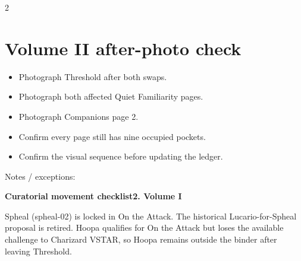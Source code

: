 \documentclass[10pt,a4paper]{article}
\newcommand{\smallnote}[1]{{\fontsize{8.4}{10}\selectfont #1\par}}
\begin{document}
\begin{multicols}{2}
\section{Volume II after-photo check}
\begin{itemize}
\item Photograph Threshold after both swaps.
\item Photograph both affected Quiet Familiarity pages.
\item Photograph Companions page 2.
\item Confirm every page still has nine occupied pockets.
\item Confirm the visual sequence before updating the ledger.
\end{itemize}

Notes / exceptions:
\noindent\hrulefill\par\noindent\hrulefill\par\noindent\hrulefill
\end{multicols}

\newpage
{\LARGE\bfseries Curatorial movement checklist}\hfill{\bfseries 2. Volume I}

\smallnote{Spheal (spheal-02) is locked in On the Attack. The historical Lucario-for-Spheal proposal is retired. Hoopa qualifies for On the Attack but loses the available challenge to Charizard VSTAR, so Hoopa remains outside the binder after leaving Threshold.}
\end{document}
